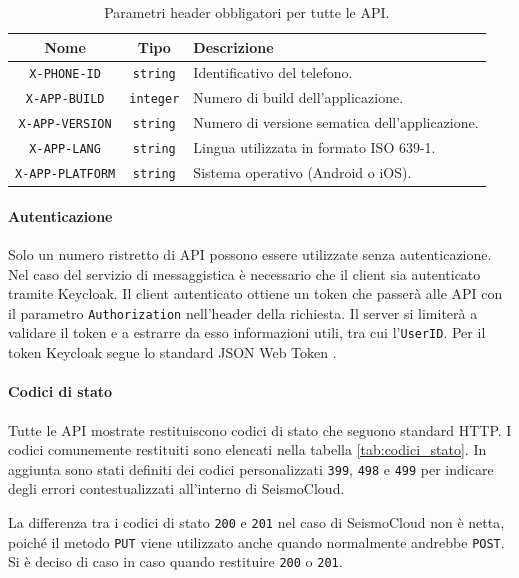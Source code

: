 \begin{table}[ht!]
\centering
\caption{Parametri header obbligatori per tutte le API.}
\label{tab:header_obbligatori}

\begin{tabular}{c|c|p{19em}}
\textbf{Nome} & \textbf{Tipo} & \textbf{Descrizione} \\
\hline
\texttt{X-PHONE-ID} & \texttt{string} & Identificativo del telefono. \\
\texttt{X-APP-BUILD} & \texttt{integer} & Numero di build dell'applicazione. \\
\texttt{X-APP-VERSION} & \texttt{string} & Numero di versione sematica dell'applicazione. \\
\texttt{X-APP-LANG} & \texttt{string} & Lingua utilizzata in formato ISO 639-1. \\
\texttt{X-APP-PLATFORM} & \texttt{string} & Sistema operativo (Android o iOS).
\end{tabular}
\end{table}

\paragraph{Autenticazione} Solo un numero ristretto di API possono essere utilizzate senza autenticazione. Nel caso del servizio di messaggistica è necessario che il client sia autenticato tramite Keycloak. Il client autenticato ottiene un token che passerà alle API con il parametro \texttt{Authorization} nell'header della richiesta. Il server si limiterà a validare il token e a estrarre da esso informazioni utili, tra cui l'\texttt{UserID}. Per il token Keycloak segue lo standard JSON Web Token \cite{json-token}.

\paragraph{Codici di stato} Tutte le API mostrate restituiscono codici di stato che seguono standard HTTP. I codici comunemente restituiti sono elencati nella tabella \ref{tab:codici_stato}. In aggiunta sono stati definiti dei codici personalizzati \texttt{399}, \texttt{498} e \texttt{499} per indicare degli errori contestualizzati all'interno di SeismoCloud. 

La differenza tra i codici di stato \texttt{200} e \texttt{201} nel caso di SeismoCloud non è netta, poiché il metodo \texttt{PUT} viene utilizzato anche quando normalmente andrebbe \texttt{POST}. Si è deciso di caso in caso quando restituire \texttt{200} o \texttt{201}.

